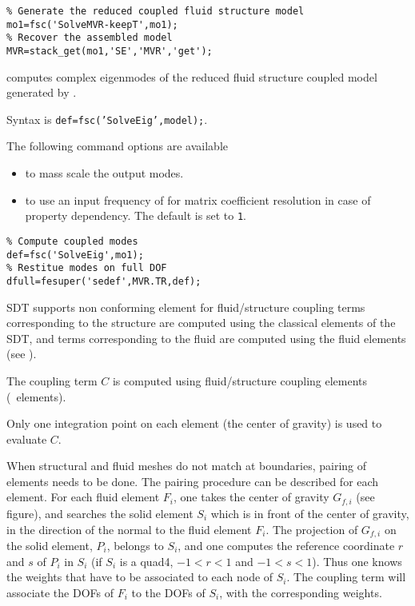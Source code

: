 \begin{SDT}
\begin{verbatim}
% Generate the reduced coupled fluid structure model
mo1=fsc('SolveMVR-keepT',mo1);  
% Recover the assembled model
MVR=stack_get(mo1,'SE','MVR','get');
\end{verbatim}%



 computes complex eigenmodes of the reduced fluid structure coupled model generated by .

Syntax is {\tt def=fsc('SolveEig',model);}.

The following command options are available
\begin{itemize}
\item {} to mass scale the output modes.
\item {} to use an input frequency of  for matrix coefficient resolution in case of property dependency. The default is set to {\tt 1}.
\end{itemize}

\begin{verbatim}
% Compute coupled modes
def=fsc('SolveEig',mo1);
% Restitue modes on full DOF
dfull=fesuper('sedef',MVR.TR,def);
\end{verbatim}%





SDT supports non conforming element for fluid/structure coupling  terms corresponding to the structure are computed using the classical elements of the SDT, and terms corresponding to the fluid are computed using the fluid elements (see \fluid).

The coupling term $C$ is computed using fluid/structure coupling elements (\fsc\ elements).

Only one integration point on each element (the center of gravity) is used to evaluate $C$.

When structural and fluid meshes do not match at boundaries, pairing of elements needs to be done.
The pairing procedure can be described for each element.
For each fluid element $F_i$, one takes the center of gravity $G_{f,i}$ (see figure), and searches the solid element $S_i$ which is in front of the center of gravity, in the direction of the normal to the fluid element $F_i$. The projection of $G_{f,i}$ on the solid element, $P_i$, belongs to $S_i$, and one computes the reference coordinate $r$ and $s$ of $P_i$ in $S_i$ (if $S_i$ is a quad4, $-1<r<1$ and $-1<s<1$). Thus one knows the weights that have to be associated to each node of $S_i$. The coupling term will associate the DOFs of $F_i$ to the DOFs of $S_i$, with the corresponding weights.

\begin{center}
\end{center}

\end{SDT}

